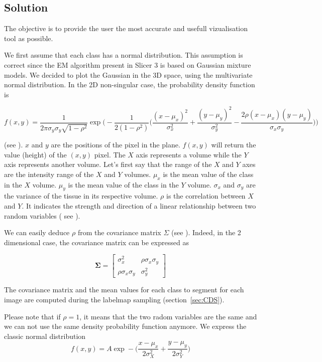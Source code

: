 \subsection{Solution}
The objective is to provide the user the most accurate and usefull vizualisation tool as possible.
\par
We first assume that each class has a normal distribution. This assumption is correct since the EM algorithm present in Slicer 3 is based on Gaussian mixture models. We decided to plot the Gaussian in the 3D space, using the multivariate normal distribution.
In the 2D non-singular case, the probability density function is 

\begin{equation}\label{GDDDPGDGS}
f(x,y)=\frac{1}{2 \pi \sigma_y \sigma_y \sqrt{1-\rho^2}} \operatorname*{exp}\Big ( -\frac{1}{2(1-\rho^2)}\Big( \frac{(x-\mu_x)^2}{\sigma_x^2} + \frac{(y-\mu_y)^2}{\sigma_y^2} - \frac{2\rho(x-\mu_x)(y-\mu_y)}{\sigma_x \sigma_y}\Big)\Big)   
\end{equation}

(see \cite{15}). $x$ and $y$ are the positions of the pixel in the plane. $f(x,y)$ will return the value (height) of the $(x,y)$ pixel. The $X$ axis represents a volume while the $Y$ axis represents another volume. Let's first say that the range of the $X$ and $Y$ axes are the intensity range of the $X$ and $Y$ volumes. $\mu_x$ is the mean value of the class in the $X$ volume. $\mu_y$ is the mean value of the class in the $Y$ volume. $\sigma_x$ and  $\sigma_y$ are the variance of the tissue in its respective volume. $\rho$ is the correlation between $X$ and $Y$. It indicates the strength and direction of a linear relationship between two random variables ( see \cite{16}). 


\par
We can easily deduce $\rho$ from the covariance matrix $\Sigma$ (see \cite{17}). Indeed, in the 2 dimensional case, the covariance matrix can be expressed as

\begin{equation*}
\mathbf{\Sigma} = 
 \begin{bmatrix}
   \sigma_x^2 & \rho \sigma_x \sigma_y \\
   \rho \sigma_x \sigma_y & \sigma_y^2
 \end{bmatrix}
\end{equation*}

The covariance matrix and the mean values for each class to segment for each image are computed during the labelmap sampling (section~\ref{sec:CDS}). 
\par
Please note that if $\rho = 1$, it means that the two radom variables are the same and we can not use the same density probability function anymore. We express the classic normal distribution
\begin{equation}\label{GDPGDGS}
f(x,y)=A\operatorname*{exp}-\Big ( \frac{x-\mu_x}{2\sigma_X^2} + \frac{y-\mu_y}{2\sigma_Y^2}\Big)   
\end{equation}

